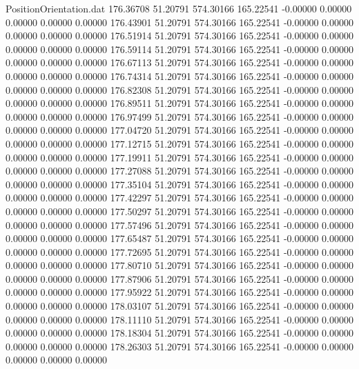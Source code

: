 \begin{filecontents}{PositionOrientation.dat}
 176.36708   51.20791  574.30166   165.22541   -0.00000    0.00000    0.00000    0.00000    0.00000
 176.43901   51.20791  574.30166   165.22541   -0.00000    0.00000    0.00000    0.00000    0.00000
 176.51914   51.20791  574.30166   165.22541   -0.00000    0.00000    0.00000    0.00000    0.00000
 176.59114   51.20791  574.30166   165.22541   -0.00000    0.00000    0.00000    0.00000    0.00000
 176.67113   51.20791  574.30166   165.22541   -0.00000    0.00000    0.00000    0.00000    0.00000
 176.74314   51.20791  574.30166   165.22541   -0.00000    0.00000    0.00000    0.00000    0.00000
 176.82308   51.20791  574.30166   165.22541   -0.00000    0.00000    0.00000    0.00000    0.00000
 176.89511   51.20791  574.30166   165.22541   -0.00000    0.00000    0.00000    0.00000    0.00000
 176.97499   51.20791  574.30166   165.22541   -0.00000    0.00000    0.00000    0.00000    0.00000
 177.04720   51.20791  574.30166   165.22541   -0.00000    0.00000    0.00000    0.00000    0.00000
 177.12715   51.20791  574.30166   165.22541   -0.00000    0.00000    0.00000    0.00000    0.00000
 177.19911   51.20791  574.30166   165.22541   -0.00000    0.00000    0.00000    0.00000    0.00000
 177.27088   51.20791  574.30166   165.22541   -0.00000    0.00000    0.00000    0.00000    0.00000
 177.35104   51.20791  574.30166   165.22541   -0.00000    0.00000    0.00000    0.00000    0.00000
 177.42297   51.20791  574.30166   165.22541   -0.00000    0.00000    0.00000    0.00000    0.00000
 177.50297   51.20791  574.30166   165.22541   -0.00000    0.00000    0.00000    0.00000    0.00000
 177.57496   51.20791  574.30166   165.22541   -0.00000    0.00000    0.00000    0.00000    0.00000
 177.65487   51.20791  574.30166   165.22541   -0.00000    0.00000    0.00000    0.00000    0.00000
 177.72695   51.20791  574.30166   165.22541   -0.00000    0.00000    0.00000    0.00000    0.00000
 177.80710   51.20791  574.30166   165.22541   -0.00000    0.00000    0.00000    0.00000    0.00000
 177.87906   51.20791  574.30166   165.22541   -0.00000    0.00000    0.00000    0.00000    0.00000
 177.95922   51.20791  574.30166   165.22541   -0.00000    0.00000    0.00000    0.00000    0.00000
 178.03107   51.20791  574.30166   165.22541   -0.00000    0.00000    0.00000    0.00000    0.00000
 178.11110   51.20791  574.30166   165.22541   -0.00000    0.00000    0.00000    0.00000    0.00000
 178.18304   51.20791  574.30166   165.22541   -0.00000    0.00000    0.00000    0.00000    0.00000
 178.26303   51.20791  574.30166   165.22541   -0.00000    0.00000    0.00000    0.00000    0.00000

\end{filecontents}
